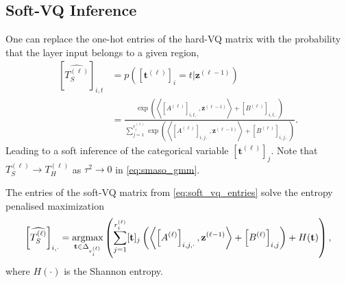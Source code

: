 \subsection{Soft-VQ Inference}

One can replace the one-hot entries of the hard-VQ matrix with the probability that the layer input belongs to a given region, 
\begin{align}\label{eq:soft_vq_entries}
    \left[\widehat{T_S^{(\ell)}}\right]_{i,t}&=p\left(\left[\mathbf{t}^{(\ell)}\right]_i=t\vert\mathbf{z}^{(\ell-1)}\right)\nonumber\\&=\frac{\exp\left(\left\langle\left[A^{(\ell)}\right]_{i,t,\cdot},\mathbf{z}^{(\ell-1)}\right\rangle+\left[B^{(\ell)}\right]_{i,t,\cdot}\right)}{\sum_{j=1}^{r^{(\ell)}_i}\exp\left(\left\langle\left[A^{(\ell)}\right]_{i,j,\cdot},\mathbf{z}^{(\ell-1)}\right\rangle+\left[B^{(\ell)}\right]_{i,j,\cdot}\right)}.
\end{align}
Leading to a soft inference of the categorical variable $\left[\mathbf{t}^{(\ell)}\right]_j$. Note that $T_S^{(\ell)}\to T_H^{(\ell)}$ as $\tau^2\to0$ in \eqref{eq:smaso_gmm}.

\begin{theorem}\label{thm:soft_vq}
    The entries of the soft-VQ matrix from \eqref{eq:soft_vq_entries} solve the entropy penalised maximization $$\left[\widehat{T_S^{(\ell)}}\right]_{i,\cdot}=\operatorname*{\mathrm{argmax}}_{\mathbf{t}\in\Delta_{r^{(\ell)}_i}}\left(\sum_{j=1}^{r^{(\ell)}_i}[\mathbf{t}]_j\left(\left\langle\left[A^{(\ell)}\right]_{i,j,\cdot},\mathbf{z}^{(\ell-1)}\right\rangle+\left[B^{(\ell)}\right]_{i,j}\right)+H(\mathbf{t})\right),$$where $H(\cdot)$ is the Shannon entropy.
\end{theorem}

